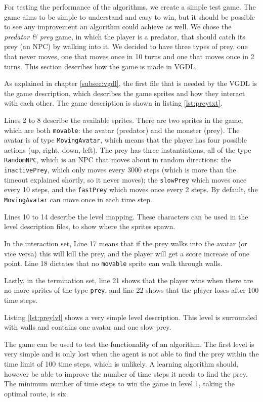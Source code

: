 For testing the performance of the algorithms, we create a simple test game. The
game aims to be simple to understand and easy to win, but it should be possible
to see any improvement an algorithm could achieve as well. We chose the
\emph{predator \& prey} game, in which the player is a predator, that should
catch its prey (an NPC) by walking into it. We decided to have three types of
prey, one that never moves, one that moves once in 10 turns and one that moves
once in 2 turns. This section describes how the game is made in VGDL.

As explained in chapter \ref{subsec:vgdl}, the first file that is needed by the
VGDL is the game description, which describes the game sprites and how they
interact with each other. The game description is shown in listing
\ref{lst:preytxt}.

Lines 2 to 8 describe the available sprites. There are two sprites in the game,
which are both \texttt{movable}: the avatar (predator) and the monster (prey).
The avatar is of type \texttt{MovingAvatar}, which means that the player has
four possible actions (up, right, down, left). The prey has three
instantiations, all of the type \texttt{RandomNPC}, which is an NPC that moves
about in random directions: the \texttt{inactivePrey}, which only moves every
3000 steps (which is more than the timeout explained shortly, so it never
moves); the \texttt{slowPrey} which moves once every 10 steps, and the
\texttt{fastPrey} which moves once every 2 steps.  By default, the
\texttt{MovingAvatar} can move once in each time step.

Lines 10 to 14 describe the level mapping. These characters can be used in the
level description files, to show where the sprites spawn. 

In the interaction set, Line 17 means that if the prey walks into the avatar (or
vice versa) this will kill the prey, and the player will get a score increase of
one point. Line 18 dictates that no \texttt{movable} sprite can walk through
walls.

Lastly, in the termination set, line 21 shows that the player wins when there
are no more sprites of the type \texttt{prey}, and line 22 shows that the player
loses after 100 time steps.

Listing \ref{lst:preylvl} shows a very simple level description. This level is
surrounded with walls and contains one avatar and one slow prey. 

The game can be used to test the functionality of an algorithm. The first level
is very simple and is only lost when the agent is not able to find the prey
within the time limit of 100 time steps, which is unlikely. A learning
algorithm should, however be able to improve the number of time steps it needs
to find the prey. The minimum number of time steps to win the game in level 1,
taking the optimal route, is six.

